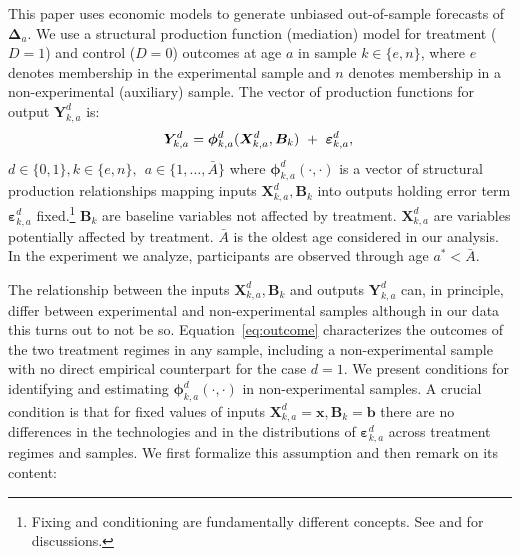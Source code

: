 \noindent This paper uses economic models to generate unbiased out-of-sample forecasts of $\bm{\Delta}_a$. We use a structural production function (mediation) model for treatment ($D=1$) and control ($D=0$) outcomes at age $a$ in sample $k \in \{e,n\}$, where $e$ denotes membership in the experimental sample and $n$ denotes membership in a non-experimental (auxiliary) sample. The vector of production functions for output $\bm{Y}^d_{k,a}$ is:
\begin{equation}
\bm{Y}^d_{k,a} = \bm{\phi}^d_{k,a} (\bm{X}^d_{k,a}, \bm{B}_k) \ + \ \bm{\varepsilon}^d_{k,a},  \label{eq:outcome} \\
\end{equation}
$d \in\{0,1\},  k\in\{e,n\}, \ \ a\in\{1,\dots,\bar{A}\}$ where $\bm{\phi}^d_{k,a}\left( \cdot, \cdot \right)$ is a vector of structural production relationships mapping inputs $\bm{X}^d_{k,a}, \bm{B}_k$ into outputs holding error term $\bm{\varepsilon}^d_{k,a}$ fixed.\footnote{Fixing and conditioning are fundamentally different concepts. See \cite{Haavelmo_1943_Econometrica} and \citet{Heckman_Pinto_2015_EconometReviews} for discussions.} $ \bm{B}_k$ are baseline variables not affected by treatment. $\bm{X}^d_{k,a}$ are variables potentially affected by treatment. $\bar{A}$ is the oldest age considered in our analysis. In the experiment we analyze, participants are observed through age $a^*< \bar{A}$.

The relationship between the inputs $\bm{X}^d_{k,a}, \bm{B}_k$ and outputs $\bm{Y}^d_{k,a}$ can, in principle, differ between experimental and non-experimental samples although in our data this turns out to not be so. Equation~\eqref{eq:outcome} characterizes the outcomes of the two treatment regimes in any sample, including a non-experimental sample with no direct empirical counterpart for the case $d = 1$. We present conditions for identifying and estimating $\bm{\phi}^d_{k,a}\left( \cdot, \cdot \right)$ in non-experimental samples. A crucial condition is that for fixed values of inputs $\bm{X}^d_{k,a} = \bm{x}, \bm{B}_k = \bm{b}$ there are no differences in the technologies and in the distributions of $\bm{\varepsilon}_{k,a}^d$ across treatment regimes and samples. We first formalize this assumption and then remark on its content:

\onehalfspacing

